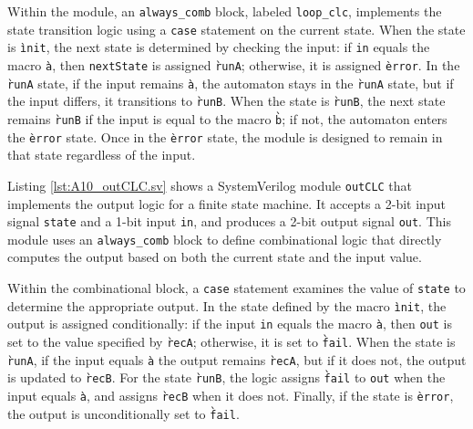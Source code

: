 \begin{exemplu}
{Within the module, an \texttt{always\_comb} block, labeled \texttt{loop\_clc}, implements the state transition logic using a \texttt{case} statement on the current state. When the state is \texttt{\`init}, the next state is determined by checking the input: if \texttt{in} equals the macro \texttt{\`a}, then \texttt{nextState} is assigned \texttt{\`runA}; otherwise, it is assigned \texttt{\`error}. In the \texttt{\`runA} state, if the input remains \texttt{\`a}, the automaton stays in the \texttt{\`runA} state, but if the input differs, it transitions to \texttt{\`runB}. When the state is \texttt{\`runB}, the next state remains \texttt{\`runB} if the input is equal to the macro \texttt{\`b}; if not, the automaton enters the \texttt{\`error} state. Once in the \texttt{\`error} state, the module is designed to remain in that state regardless of the input.



Listing \ref{lst:A10_outCLC.sv} shows a SystemVerilog module \texttt{outCLC} that implements the output logic for a finite state machine. It accepts a 2-bit input signal \texttt{state} and a 1-bit input \texttt{in}, and produces a 2-bit output signal \texttt{out}. This module uses an \texttt{always\_comb} block to define combinational logic that directly computes the output based on both the current state and the input value.

Within the combinational block, a \texttt{case} statement examines the value of \texttt{state} to determine the appropriate output. In the state defined by the macro \texttt{\`init}, the output is assigned conditionally: if the input \texttt{in} equals the macro \texttt{\`a}, then \texttt{out} is set to the value specified by \texttt{\`recA}; otherwise, it is set to \texttt{\`fail}. When the state is \texttt{\`runA}, if the input equals \texttt{\`a} the output remains \texttt{\`recA}, but if it does not, the output is updated to \texttt{\`recB}. For the state \texttt{\`runB}, the logic assigns \texttt{\`fail} to \texttt{out} when the input equals \texttt{\`a}, and assigns \texttt{\`recB} when it does not. Finally, if the state is \texttt{\`error}, the output is unconditionally set to \texttt{\`fail}.


}
\end{exemplu}
